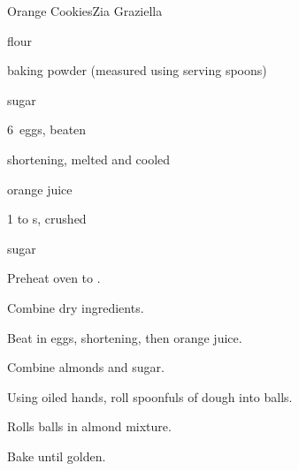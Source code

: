 \begin{recipe}{Orange Cookies\FIXME}{Zia Graziella}{}

\begin{ingredients}
\item {} flour
\item {} baking powder (measured using serving spoons)
\item {} sugar
\item 6~eggs, beaten
\item \lbs{\half} shortening, melted and cooled
\item {} orange juice
\item 1 to  s, crushed
\item sugar
\end{ingredients}

\begin{directions}
\item Preheat oven to .
\item Combine dry ingredients.
\item Beat in eggs, shortening, then orange juice.
\item Combine almonds and sugar.
\item Using oiled hands, roll spoonfuls of dough into balls.
\item Rolls balls in almond mixture.
\item Bake until golden. 
\end{directions}

\end{recipe}
